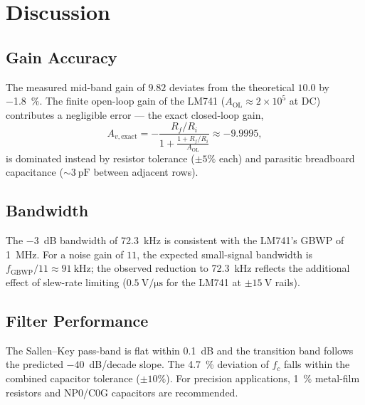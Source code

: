 \section{Discussion}

\subsection{Gain Accuracy}

The measured mid-band gain of $9.82$ deviates from the theoretical $10.0$
by \qty{-1.8}{\percent}.  The finite open-loop gain of the LM741
($A_{\text{OL}}\approx2\times10^{5}$ at DC) contributes a negligible error
--- the exact closed-loop gain,
\begin{equation}
  A_{v,\text{exact}}
    = -\frac{R_f/R_i}
           {1+\frac{1+R_f/R_i}{A_{\text{OL}}}}
    \approx -9.9995 ,
  \label{eq:exact}
\end{equation}
is dominated instead by resistor tolerance ($\pm5\%$ each) and parasitic
breadboard capacitance ($\sim\qty{3}{\pF}$ between adjacent rows).

\subsection{Bandwidth}

The \qty{-3}{\dB} bandwidth of \qty{72.3}{\kHz} is consistent with the
LM741's GBWP of \qty{1}{\MHz}.  For a noise gain of $11$, the expected
small-signal bandwidth is $f_{\text{GBWP}}/11 \approx
\qty{91}{\kHz}$; the observed reduction to \qty{72.3}{\kHz} reflects the
additional effect of slew-rate limiting ($\qty{0.5}{\V/\us}$ for the
LM741 at $\pm\qty{15}{\V}$ rails).

\subsection{Filter Performance}

The Sallen--Key pass-band is flat within \qty{0.1}{\dB} and the transition
band follows the predicted $-40$~dB/decade slope.  The \qty{4.7}{\percent}
deviation of $f_c$ falls within the combined capacitor tolerance
($\pm10\%$).  For precision applications, \qty{1}{\percent} metal-film
resistors and NP0/C0G capacitors are recommended.

